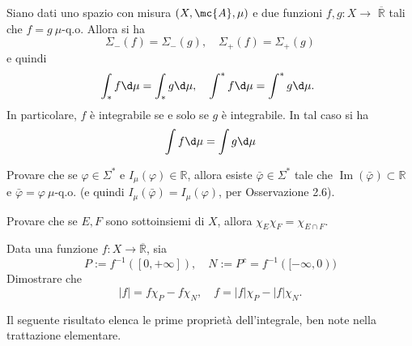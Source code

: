 \begin{oss}
     Siano dati uno spazio con misura $(X, \mc{A}, \mu)$ e due funzioni $f, g: X \rightarrow$ $\overline{\mathbb{R}}$ tali che $f=g \ \mu$-q.o. Allora si ha
    \[
    \Sigma_{-}(f)=\Sigma_{-}(g), \quad \Sigma_{+}(f)=\Sigma_{+}(g)
    \]
    e quindi
    \[
    \int_{*} f \d \mu=\int_{*} g \d \mu, \quad \int^{*} f \d \mu=\int^{*} g \d \mu \text {. }
    \]
    In particolare, $f$ è integrabile se e solo se $g$ è integrabile. In tal caso si ha
    \[
    \int f \d \mu=\int g \d \mu
    \]
\end{oss}


\begin{exc}\label{exc: 2.5}
    Provare che se $\varphi \in \Sigma^{*}$ e $I_{\mu}(\varphi) \in \mathbb{R}$, allora esiste $\bar{\varphi} \in \Sigma^{*}$ tale che $\operatorname{Im}(\bar{\varphi}) \subset \mathbb{R}$ e $\bar{\varphi}=\varphi \ \mu$-q.o. (e quindi $I_{\mu}(\bar{\varphi})=I_{\mu}(\varphi)$, per Osservazione 2.6).
\end{exc}


\begin{exc}
    Provare che se $E, F$ sono sottoinsiemi di $X$, allora $\chi_{E} \chi_{F}=\chi_{E \cap F}$.
\end{exc}

\begin{exc}\label{exc: 2.7}
    Data una funzione $f: X \rightarrow \overline{\mathbb{R}}$, sia
    \[
    P:=f^{-1}([0,+\infty]), \quad N:=P^{c}=f^{-1}([-\infty, 0))
    \]
    Dimostrare che
    \[
    |f|=f \chi_{P}-f \chi_{N}, \quad f=|f| \chi_{P}-|f| \chi_{N} .
    \]
\end{exc}

Il seguente risultato elenca le prime proprietà dell'integrale, ben note nella trattazione elementare.

